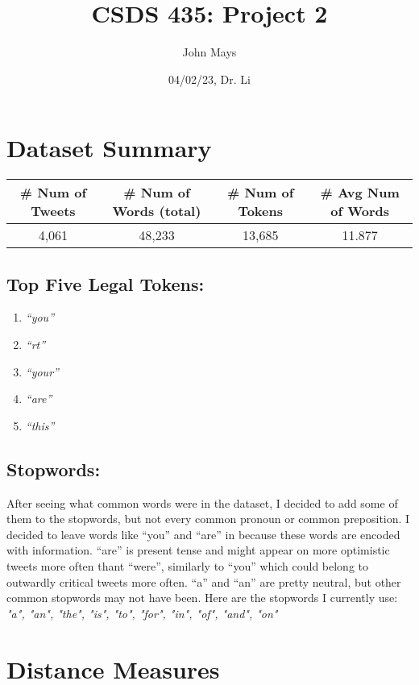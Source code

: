 \documentclass[fleqn]{article}
\title{\textbf{CSDS 435: Project 2}}
\author{John Mays}
\date{04/02/23, Dr. Li}
\begin{document}
\maketitle

\section{Dataset Summary}
\begin{tabular}{|c|c|c|c|}
    \hline
    \textbf{\# Num of Tweets} & \textbf{\# Num of Words (total)} & \textbf{\# Num of Tokens} & \textbf{\# Avg Num of Words}\\
    \hline
    4,061&48,233&13,685&11.877\\
    \hline
\end{tabular}
\subsection{Top Five Legal Tokens:}
\begin{enumerate}
    \item \textit{``you''}
    \item \textit{``rt''}
    \item \textit{``your''}
    \item \textit{``are''}
    \item \textit{``this''}
\end{enumerate}
\subsection{Stopwords:}
After seeing what common words were in the dataset, I decided to add some of them to the stopwords, but not every common pronoun or common preposition.  I decided to leave words like ``you'' and ``are'' in because these words are encoded with information.  ``are'' is present tense and might appear on more optimistic tweets more often thant ``were'', similarly to ``you'' which could belong to outwardly critical tweets more often.  ``a'' and ``an'' are pretty neutral, but other common stopwords may not have been.  Here are the stopwords I currently use:\\
\newline
\textit{"a", "an", "the", "is", "to", "for", "in", "of", "and", "on"}


\section{Distance Measures}
\end{document}
